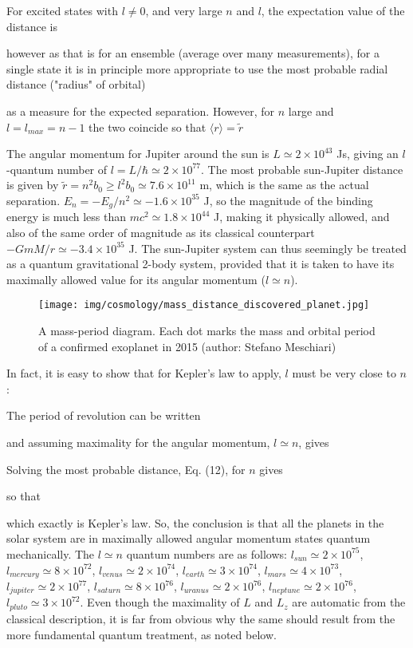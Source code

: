	For excited states with $l \neq 0$, and very large $n$ and $l$,
	the expectation value of the distance is
	
	however as that is for an ensemble (average over many
	measurements), for a single state it is in principle more
	appropriate to use the most probable radial distance ("radius" of
	orbital)
	
	as a measure for the expected separation. However, for $n$ large
	and $l=l_{max} = n-1$ the two coincide so that $\langle r \rangle
	= \tilde{r}$
	
	The angular momentum for Jupiter around the sun is $L \simeq 2
	\times 10^{43}$ Js, giving an $l$-quantum number of $l = L/\hbar
	\simeq 2 \times 10^{77}$. The most probable sun-Jupiter distance
	is given by $\tilde{r} = n^2 b_0 \geq l^2 b_0 \simeq 7.6 \times
	10^{11}$ m, which is the same as the actual separation. $E_n =
	-E_g/n^2 \simeq - 1.6 \times 10^{35}$ J, so the magnitude of the
	binding energy is much less than $mc^2 \simeq 1.8 \times 10^{44}$
	J, making it physically allowed, and also of the same order of
	magnitude as its classical counterpart $-GmM/r \simeq - 3.4 \times
	10^{35}$ J. The sun-Jupiter system can thus seemingly be treated
	as a quantum gravitational 2-body system, provided that it is
	taken to have its maximally allowed value for its angular momentum
	($l \simeq n$).
	 \begin{figure}[H]
		\centering
		\texttt{[image: img/cosmology/mass\_distance\_discovered\_planet.jpg]}
		\caption[Mass-period diagram of confirmed discovered exoplanets in 2015]{A mass-period diagram. Each dot marks the mass and orbital period of a confirmed exoplanet in 2015 (author: Stefano Meschiari)}
	\end{figure}
	In fact, it is easy to show that for Kepler's law to apply, $l$
	must be very close to $n$:
	
	The period of revolution can be written
	
	
	and assuming maximality for the angular momentum, $l \simeq n$,
	gives
	
	
	Solving the most probable distance, Eq. (12), for $n$ gives
	
	so that
	
	which exactly is Kepler's law. So, the conclusion is that all the
	planets in the solar system are in maximally allowed angular
	momentum states quantum mechanically. The $l \simeq n$ quantum
	numbers are as follows: $l_{sun} \simeq 2 \times 10^{75}$,
	$l_{mercury} \simeq 8 \times 10^{72}$, $l_{venus} \simeq 2 \times
	10^{74}$, $l_{earth} \simeq 3 \times 10^{74}$, $l_{mars} \simeq 4
	\times 10^{73}$, $l_{jupiter} \simeq 2 \times 10^{77}$,
	$l_{saturn} \simeq 8 \times 10^{76}$, $l_{uranus} \simeq 2 \times
	10^{76}$, $l_{neptune} \simeq 2 \times 10^{76}$, $l_{pluto} \simeq
	3 \times 10^{72}$. Even though the maximality of $L$ and $L_z$ are
	automatic from the classical description, it is far from obvious
	why the same should result from the more fundamental quantum
	treatment, as noted below.
	
